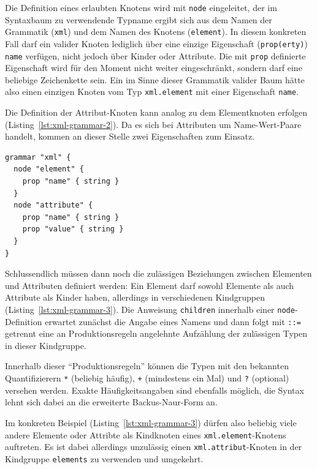 \documentclass[paper=a4,fontsize=11pt,parskip=half]{scrartcl}
\begin{document}
Die Definition eines erlaubten Knotens wird mit \texttt{node} eingeleitet, der im Syntaxbaum zu verwendende Typname ergibt sich aus dem Namen der Grammatik (\texttt{xml}) und dem Namen des Knotens (\texttt{element}). In diesem konkreten Fall darf ein valider Knoten lediglich über eine einzige Eigenschaft (\texttt{prop(erty)}) \texttt{name} verfügen, nicht jedoch über Kinder oder Attribute. Die mit \texttt{prop} definierte Eigenschaft wird für den Moment nicht weiter eingeschränkt, sondern darf eine beliebige Zeichenkette sein. Ein im Sinne dieser Grammatik valider Baum hätte also einen einzigen Knoten vom Typ \texttt{xml.element} mit einer Eigenschaft \texttt{name}.

Die Definition der Attribut-Knoten kann analog zu dem Elementknoten erfolgen (Listing~\ref{lst:xml-grammar-2}). Da es sich bei Attributen um Name-Wert-Paare handelt, kommen an dieser Stelle zwei Eigenschaften zum Einsatz.

\begin{lstlisting}[float=h, label={lst:xml-grammar-2},caption={\texttt{XML} Schritt 2 - Elemente mit Namen, Attribute mit Schlüssel-Wert-Paaren},captionpos=b,language={Grammar}]
grammar "xml" {
  node "element" {
    prop "name" { string }
  }
  node "attribute" {
    prop "name" { string }
    prop "value" { string }
  }
}
\end{lstlisting}

Schlussendlich müssen dann noch die zulässigen Beziehungen zwischen Elementen und Attributen definiert werden: Ein Element darf sowohl Elemente als auch Attribute als Kinder haben, allerdings in verschiedenen Kindgruppen (Listing~\ref{lst:xml-grammar-3}). Die Anweisung \texttt{children} innerhalb einer \texttt{node}-Definition erwartet zunächst die Angabe eines Namens und dann folgt mit \texttt{::=} getrennt eine an Produktionsregeln angelehnte Aufzählung der zulässigen Typen in dieser Kindgruppe.

Innerhalb dieser \enquote{Produktionsregeln} können die Typen mit den bekannten Quantifizierern \texttt{*} (beliebig häufig), \texttt{+} (mindestens ein Mal) und \texttt{?} (optional) versehen werden. Exakte Häufigkeitsangaben sind ebenfalls möglich, die Syntax lehnt sich dabei an die erweiterte Backus-Naur-Form an.

Im konkreten Beispiel (Listing~\ref{lst:xml-grammar-3}) dürfen also beliebig viele andere Elemente oder Attribte als Kindknoten eines \texttt{xml.element}-Knotens auftreten. Es ist dabei allerdings unzulässig einen \texttt{xml.attribut}-Knoten in der Kindgruppe \texttt{elements} zu verwenden und umgekehrt.
\end{document}
